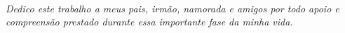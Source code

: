 \thispagestyle{empty}

\

\vfill

\begin{flushright}
\textit{Dedico este trabalho a meus pais, irmão, namorada e amigos por todo apoio e compreensão prestado durante essa importante fase da minha vida.}
\vspace*{1cm}

\end{flushright}

\vspace*{1cm}

\clearpage
